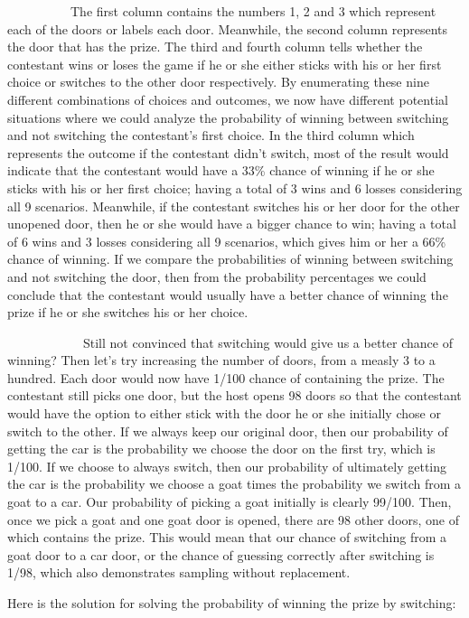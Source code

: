 \documentclass[
]{article}
\begin{document}
~~~~~~~~~~The first column contains the numbers 1, 2 and 3 which
represent each of the doors or labels each door. Meanwhile, the second
column represents the door that has the prize. The third and fourth
column tells whether the contestant wins or loses the game if he or she
either sticks with his or her first choice or switches to the other door
respectively. By enumerating these nine different combinations of
choices and outcomes, we now have different potential situations where
we could analyze the probability of winning between switching and not
switching the contestant's first choice. In the third column which
represents the outcome if the contestant didn't switch, most of the
result would indicate that the contestant would have a 33\% chance of
winning if he or she sticks with his or her first choice; having a total
of 3 wins and 6 losses considering all 9 scenarios. Meanwhile, if the
contestant switches his or her door for the other unopened door, then he
or she would have a bigger chance to win; having a total of 6 wins and 3
losses considering all 9 scenarios, which gives him or her a 66\% chance
of winning. If we compare the probabilities of winning between switching
and not switching the door, then from the probability percentages we
could conclude that the contestant would usually have a better chance of
winning the prize if he or she switches his or her choice.

~~~~~~~~~~~~Still not convinced that switching would give us a better
chance of winning? Then let's try increasing the number of doors, from a
measly 3 to a hundred. Each door would now have 1/100 chance of
containing the prize. The contestant still picks one door, but the host
opens 98 doors so that the contestant would have the option to either
stick with the door he or she initially chose or switch to the other. If
we always keep our original door, then our probability of getting the
car is the probability we choose the door on the first try, which is
1/100. If we choose to always switch, then our probability of ultimately
getting the car is the probability we choose a goat times the
probability we switch from a goat to a car. Our probability of picking a
goat initially is clearly 99/100. Then, once we pick a goat and one goat
door is opened, there are 98 other doors, one of which contains the
prize. This would mean that our chance of switching from a goat door to
a car door, or the chance of guessing correctly after switching is 1/98,
which also demonstrates sampling without replacement.

Here is the solution for solving the probability of winning the prize by
switching:
\end{document}

